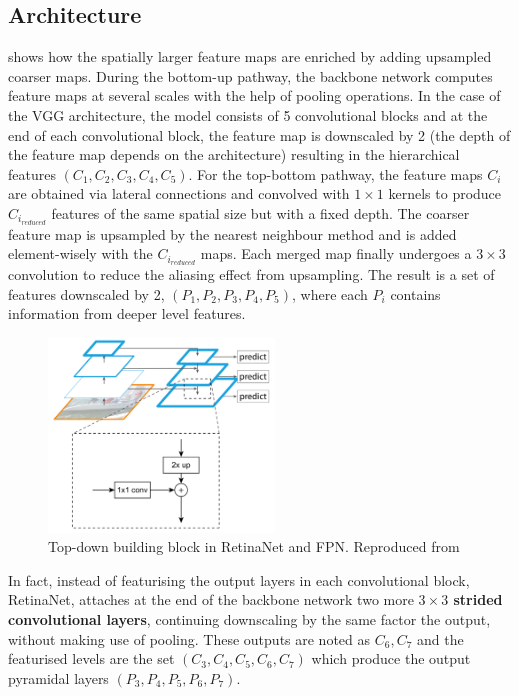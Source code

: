\subsection{Architecture}
 shows how the spatially larger feature maps are enriched by adding upsampled coarser maps. During the bottom-up pathway, the backbone network computes feature maps at several scales with the help of pooling operations. In the case of the VGG architecture, the model consists of 5 convolutional blocks and at the end of each convolutional block, the feature map is downscaled by 2 (the depth of the feature map depends on the architecture) resulting in the hierarchical features $(C_1, C_2, C_3, C_4, C_5)$. For the top-bottom pathway, the feature maps $C_i$ are obtained via lateral connections and convolved with $1\times1$ kernels to produce $C_{i_{reduced}}$ features of the same spatial size but with a fixed depth. The coarser feature map is upsampled by the nearest neighbour method and is added element-wisely with the $C_{i_{reduced}}$ maps. Each merged map finally undergoes a $3\times3$ convolution to reduce the aliasing effect from upsampling. The result is a set of features downscaled by 2, $(P_1,P_2,P_3,P_4,P_5)$, where each $P_i$ contains information from deeper level features. 

\begin{figure}[!htb]
  \centering
  \includegraphics[width=6cm]{figures/ch2/fig10.png}
  \caption{Top-down building block in RetinaNet and FPN. Reproduced from \cite{lin2017feature}}
  \label{fig10}
\end{figure} 

In fact, instead of featurising the output layers in each convolutional block, RetinaNet, attaches at the end of the backbone network two more \textbf{$3\times3$ strided convolutional layers}, continuing downscaling by the same factor the output, without making use of pooling. These outputs are noted as $C_6,C_7$ and the featurised levels are the set $(C_3, C_4, C_5, C_6, C_7)$ which produce the output pyramidal layers $(P_3, P_4, P_5, P_6, P_7)$.

